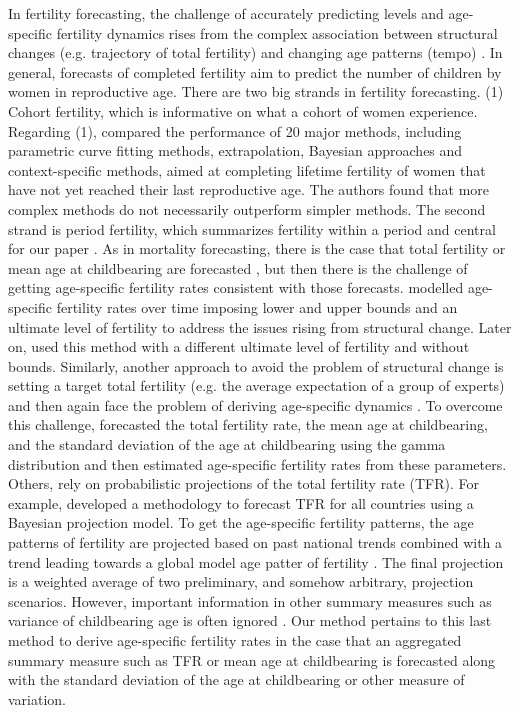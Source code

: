 \documentclass[a4paper,twoside, openright, 12pt, leqno]{article}
\begin{document}
In fertility forecasting, the challenge of accurately predicting levels and age-specific fertility dynamics rises from the complex association between structural changes (e.g. trajectory of total fertility) and changing age patterns (tempo) \citep{Booth2006}.  In general, forecasts of completed fertility aim to predict the number of children by women in reproductive age.  There are two big strands in fertility forecasting. (1) Cohort fertility, which is informative on what a cohort of women experience. Regarding (1), \citet{bohk2018forecast} compared the performance of 20 major methods, including parametric curve fitting methods, extrapolation, Bayesian approaches and context-specific methods, aimed at completing lifetime fertility of women that have not yet reached their last reproductive age. The authors found that more complex methods do not necessarily outperform simpler methods. The second strand is period fertility, which summarizes fertility within a period and central for our paper \citep{bohk2018forecast}. As in mortality forecasting, there is the case that total fertility or mean age at childbearing are forecasted \citep{miller1986bivariate}, but then there is the challenge of getting age-specific fertility rates consistent with those forecasts. \citet{lee1993modeling} modelled age-specific fertility rates over time imposing lower and upper bounds and an ultimate level of fertility to address the issues rising from structural change. Later on, \citet{lee1994stochastic} used this method with a different ultimate level of fertility and without bounds. Similarly, another approach to avoid the problem of structural change is setting a target total fertility (e.g. the average expectation of a group of experts) and then again face the problem of deriving age-specific dynamics \citep{lutz1996world}. To overcome this challenge, \citet{thompson1989multivariate} forecasted the total fertility rate, the mean age at childbearing, and the standard deviation of the age at childbearing using the gamma distribution and then estimated age-specific fertility rates from these parameters. Others, rely on probabilistic projections of the total fertility rate (TFR). For example, \citet{alkema2011probabilistic} developed a methodology to forecast TFR for all countries using a Bayesian projection model. To get the age-specific fertility patterns, the age patterns of fertility are projected based on past national trends combined with a trend leading towards a global model age patter of fertility \citep{vsevvcikova2016age, UN2017}. The final projection is a weighted average of two preliminary, and somehow arbitrary, projection scenarios. However, important information in other summary measures such as variance of childbearing age is often ignored \citep{hruschka2016does}. Our method pertains to this last method to derive age-specific fertility rates in the case that an aggregated summary measure such as TFR or mean age at childbearing is forecasted along with the standard deviation of the age at childbearing or other measure of variation. 
\end{document}
